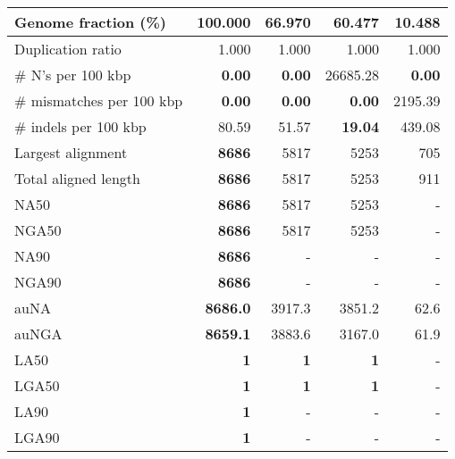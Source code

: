 \documentclass[12pt,a4paper]{article}
\begin{document}
\begin{table}[ht]
\begin{center}
\begin{tabular}{|l*{4}{|r}|}
Genome fraction (\%) & {\bf 100.000} & 66.970 & 60.477 & 10.488 \\ \hline
Duplication ratio & 1.000 & 1.000 & 1.000 & 1.000 \\ \hline
\# N's per 100 kbp & {\bf 0.00} & {\bf 0.00} & 26685.28 & {\bf 0.00} \\ \hline
\# mismatches per 100 kbp & {\bf 0.00} & {\bf 0.00} & {\bf 0.00} & 2195.39 \\ \hline
\# indels per 100 kbp & 80.59 & 51.57 & {\bf 19.04} & 439.08 \\ \hline
Largest alignment & {\bf 8686} & 5817 & 5253 & 705 \\ \hline
Total aligned length & {\bf 8686} & 5817 & 5253 & 911 \\ \hline
NA50 & {\bf 8686} & 5817 & 5253 & - \\ \hline
NGA50 & {\bf 8686} & 5817 & 5253 & - \\ \hline
NA90 & {\bf 8686} & - & - & - \\ \hline
NGA90 & {\bf 8686} & - & - & - \\ \hline
auNA & {\bf 8686.0} & 3917.3 & 3851.2 & 62.6 \\ \hline
auNGA & {\bf 8659.1} & 3883.6 & 3167.0 & 61.9 \\ \hline
LA50 & {\bf 1} & {\bf 1} & {\bf 1} & - \\ \hline
LGA50 & {\bf 1} & {\bf 1} & {\bf 1} & - \\ \hline
LA90 & {\bf 1} & - & - & - \\ \hline
LGA90 & {\bf 1} & - & - & - \\ \hline
\end{tabular}
\end{center}
\end{table}
\end{document}
